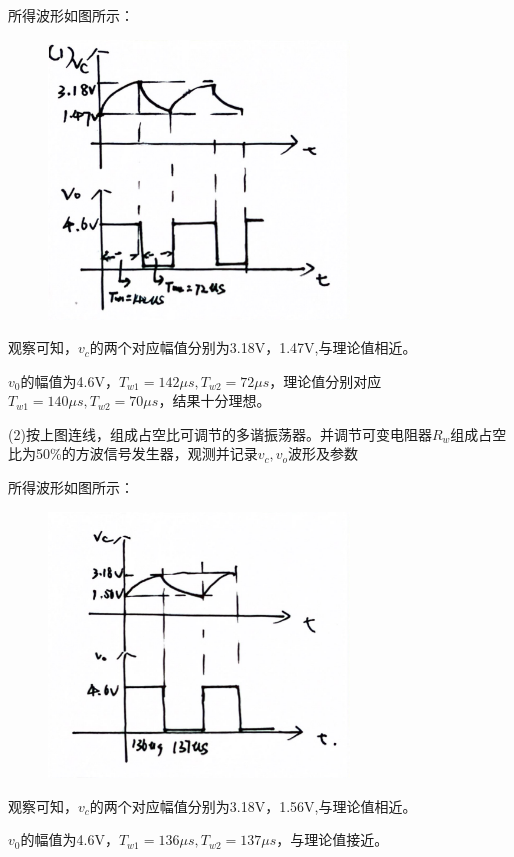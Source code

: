 \documentclass{ctexart}
\begin{document}
    所得波形如图所示：
    
    \begin{figure}[htbp]
        \centering
        \includegraphics[width=8cm]{3.2.3.jpg}
    \end{figure}

    观察可知，$v_c$的两个对应幅值分别为3.18V，1.47V,与理论值相近。

    $v_0$的幅值为4.6V，$T_{w1}=142\mu s,T_{w2}=72\mu s$，理论值分别对应$T_{w1}=140\mu s,T_{w2}=70\mu s$，结果十分理想。

    (2)按上图连线，组成占空比可调节的多谐振荡器。并调节可变电阻器$R_w$组成占空比为50\%的方波信号发生器，观测并记录$v_c,v_o$波形及参数

    所得波形如图所示：
    
    \begin{figure}[htbp]
        \centering
        \includegraphics[width=8cm]{3.2.4.jpg}
    \end{figure}
    
    观察可知，$v_c$的两个对应幅值分别为3.18V，1.56V,与理论值相近。

    $v_0$的幅值为4.6V，$T_{w1}=136\mu s,T_{w2}=137\mu s$，与理论值接近。
\end{document}
